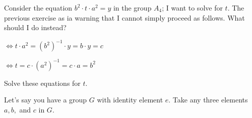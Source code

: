 \documentclass[11pt]{exam}
\begin{document}
\begin{questions}
	\question Consider the equation $b^2\cdot t\cdot a^2 = y$ in the group $A_4$; I want to solve for $t$. The previous exercise as ia warning that I cannot simply proceed as follows. What should I do instead?
	\begin{solution}
		\par $\Leftrightarrow t\cdot a^2 = (b^2)^{-1}\cdot y = b\cdot y = c$
		\par $\Leftrightarrow t = c\cdot (a^2)^{-1} = c\cdot a = b^2$
	\end{solution}

	\question Solve these equations for $t$.

	\question Let's say you have a group $G$ with identity element $e$. Take any three elements $a,b,$ and $c$ in $G$.
\end{questions}
\end{document}
